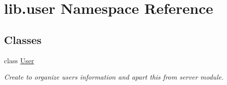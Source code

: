 \hypertarget{namespacelib_1_1user}{}\section{lib.\+user Namespace Reference}
\label{namespacelib_1_1user}
\subsection*{Classes}
\begin{DoxyCompactItemize}
\item 
class \hyperlink{classlib_1_1user_1_1_user}{User}
\begin{DoxyCompactList}\small\item\em Create to organize users information and apart this from server module. \end{DoxyCompactList}\end{DoxyCompactItemize}
